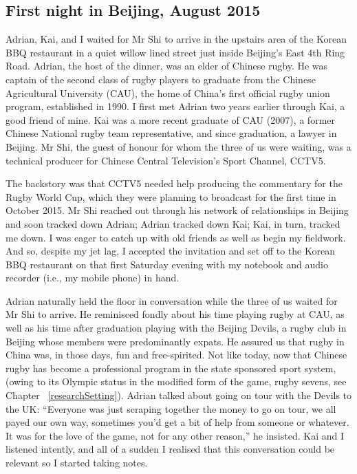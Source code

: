                                           \begin{CJK}{UTF8}{gbsn}

\section{First night in Beijing, August 2015}

Adrian, Kai, and I waited for Mr Shi to arrive in the upstairs area of the Korean BBQ restaurant in a quiet willow lined street just inside Beijing's East 4th Ring Road.  Adrian, the host of the dinner, was an elder of Chinese rugby.  He was captain of the second class of rugby players to graduate from the Chinese Agricultural University (CAU), the home of China's first official rugby union program, established in 1990.  I first met Adrian two years earlier through Kai, a good friend of mine.  Kai was a more recent graduate of CAU (2007), a former Chinese National rugby team representative, and since graduation, a lawyer in Beijing.  Mr Shi, the guest of honour for whom the three of us were waiting, was a technical producer for Chinese Central Television's Sport Channel, CCTV5.

The backstory was that CCTV5 needed help producing the commentary for the Rugby World Cup, which they were planning to broadcast for the first time in October 2015.  Mr Shi reached out through his network of relationships in Beijing and soon tracked down Adrian; Adrian tracked down Kai; Kai, in turn, tracked me down.  I was eager to catch up with old friends as well as begin my fieldwork. And so, despite my jet lag, I accepted the invitation and set off to the Korean BBQ restaurant on that first Saturday evening with my notebook and audio recorder (i.e., my mobile phone) in hand.

Adrian naturally held the floor in conversation while the three of us waited for Mr Shi to arrive.  He reminisced fondly about his time playing rugby at CAU, as well as his time after graduation playing with the Beijing Devils, a rugby club in Beijing whose members were predominantly expats.  He assured us that rugby in China was, in those days, fun and free-spirited.  Not like today, now that Chinese rugby has become a professional program in the state sponsored sport system, (owing to its Olympic status in the modified form of the game, rugby sevens, see Chapter ~\ref{researchSetting}).  Adrian talked about going on tour with the Devils to the UK:  ``Everyone was just scraping together the money to go on tour, we all payed our own way, sometimes you'd get a bit of help from someone or whatever. It was for the love of the game, not for any other reason,'' he insisted.  Kai and I listened intently, and all of a sudden I realised that this conversation could be relevant so I started taking notes.


\end{CJK}
